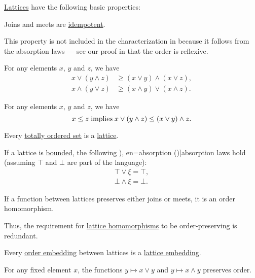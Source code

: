 \begin{proposition}\label{thm:def:lattice}
  \hyperref[def:lattice]{Lattices} have the following basic properties:
  \begin{thmenum}
     Joins and meets are \hyperref[def:binary_operation/idempotent]{idempotent}.

    This property is not included in the characterization in  because it follows from the absorption laws --- see our proof in  that the order is reflexive.

     For any elements \( x \), \( y \) and \( z \), we have
    \begin{align}
      x \vee (y \wedge z) &\geq (x \vee y) \wedge (x \vee z), \label{eq:thm:def:lattice/distributivity_inequality/join_over_meet} \\
      x \wedge (y \vee z) &\geq (x \wedge y) \vee (x \wedge z). \label{eq:thm:def:lattice/distributivity_inequality/meet_over_join}
    \end{align}

     For any elements \( x \), \( y \) and \( z \), we have
    \begin{equation}\label{eq:thm:def:lattice/modularity_inequality}
      x \leq z \T{implies} x \vee (y \wedge z) \leq (x \vee y) \wedge z.
    \end{equation}

     Every \hyperref[def:totally_ordered_set]{totally ordered set} is a \hyperref[def:lattice]{lattice}.

     If a lattice is \hyperref[def:extremal_points/bounds]{bounded}, the following \term[ru=поглощение (\cite[6]{Гуров2013}), en=absorption (\cite[8]{Birkhoff1967})]{absorption} laws hold (assuming \( \top \) and \( \bot \) are part of the language):
    \begin{align}
      \top \vee \xi = \top \label{eq:thm:def:lattice/bounded_absorption/join}, \\
      \bot \wedge \xi = \bot \label{eq:thm:def:lattice/bounded_absorption/meet}.
    \end{align}

     If a function between lattices preserves either joins or meets, it is an order homomorphism.

    Thus, the requirement for \hyperref[def:lattice/homomorphism]{lattice homomorphisms} to be order-preserving is redundant.

     Every \hyperref[def:preordered_set/homomorphism]{order embedding} between lattices is a \hyperref[def:lattice/homomorphism]{lattice embedding}.

     For any fixed element \( x \), the functions \( y \mapsto x \vee y \) and \( y \mapsto x \wedge y \) preserves order.
  \end{thmenum}
\end{proposition}

